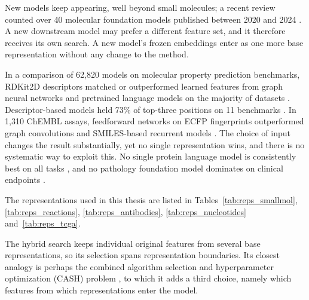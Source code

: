
New models keep appearing, well beyond small molecules; a recent review counted over 40 molecular foundation models published between 2020 and 2024 \citep{Song2026}. A new downstream model may prefer a different feature set, and it therefore receives its own search. A new model's frozen embeddings enter as one more base representation without any change to the method.

In a comparison of 62,820 models on molecular property prediction benchmarks, RDKit2D descriptors matched or outperformed learned features from graph neural networks and pretrained language models on the majority of datasets \citep{Deng2023}. Descriptor-based models held 73\% of top-three positions on 11 benchmarks \citep{Jiang2021}. In 1,310 ChEMBL assays, feedforward networks on ECFP fingerprints outperformed graph convolutions and SMILES-based recurrent models \citep{Mayr2018}. The choice of input changes the result substantially, yet no single representation wins, and there is no systematic way to exploit this. No single protein language model is consistently best on all tasks \citep{Kenlay2024, Schmirler2024}, and no pathology foundation model dominates on clinical endpoints \citep{ElNahhas2025}.


The representations used in this thesis are listed in Tables~\ref{tab:reps_smallmol}, \ref{tab:reps_reactions}, \ref{tab:reps_antibodies}, \ref{tab:reps_nucleotides} and~\ref{tab:reps_tcga}.


The hybrid search keeps individual original features from several base representations, so its selection spans representation boundaries. Its closest analogy is perhaps the combined algorithm selection and hyperparameter optimization (CASH) problem \citep{Thornton2013}, to which it adds a third choice, namely which features from which representations enter the model.

